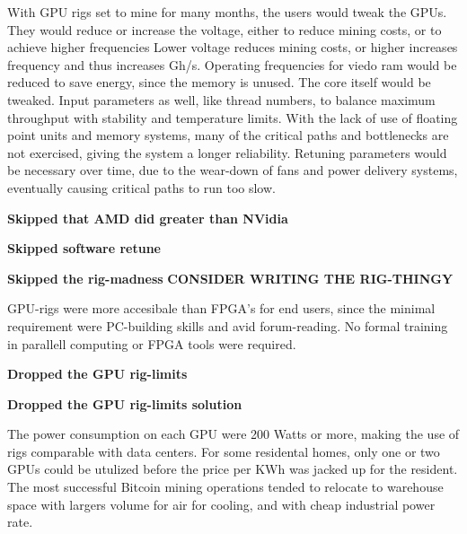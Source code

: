 With GPU rigs set to mine for many months, the users would tweak the GPUs.
They would reduce or increase the voltage, either to reduce mining costs, or to achieve higher frequencies
Lower voltage reduces mining costs, or higher increases frequency and thus increases Gh/s.
Operating frequencies for viedo ram would be reduced to save energy, since the memory is unused.
The core itself would be tweaked.
Input parameters as well, like thread numbers, to balance maximum throughput with stability and temperature limits.
With the lack of use of floating point units and memory systems, many of the critical paths and bottlenecks are not exercised, giving the system a longer reliability. 
Retuning parameters would be necessary over time, due to the wear-down of fans and power delivery systems, eventually causing critical paths to run too slow.

\textbf{Skipped that AMD did greater than NVidia}

\textbf{Skipped software retune}

\textbf{Skipped the rig-madness}
\textbf{CONSIDER WRITING THE RIG-THINGY}

GPU-rigs were more accesibale than FPGA's for end users, since the minimal requirement were PC-building skills and avid forum-reading.
No formal training in parallell computing or FPGA tools were required.

\textbf{Dropped the GPU rig-limits}

\textbf{Dropped the GPU rig-limits solution}

The power consumption on each GPU were 200 Watts or more, making the use of rigs comparable with data centers.
For some residental homes, only one or two GPUs could be utulized before the price per KWh was jacked up for the resident.
The most successful Bitcoin mining operations tended to relocate to warehouse space with largers volume for air for cooling, and with cheap industrial power rate.


